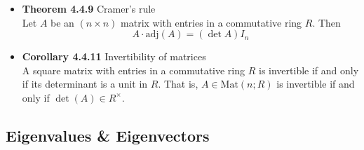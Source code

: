 \documentclass[11pt,a4paper]{article}
\begin{document}
\begin{itemize}
    \item \textbf{Theorem 4.4.9} Cramer's rule \\
        Let $A$ be an $(n \times n)$ matrix with entries in a commutative ring $R$.
        Then
        \[
            A \cdot \mathrm{adj}(A) = (\det A)I_n
        \]

    \item \textbf{Corollary 4.4.11} Invertibility of matrices \\
        A square matrix with entries in a commutative ring $R$ is invertible if and only if its
        determinant is a unit in $R$.
        That is, $A \in \mathrm{Mat}(n; R)$ is invertible if and only if $\det(A) \in R^\times$.

\end{itemize}

\subsection{Eigenvalues \& Eigenvectors}
\end{document}
